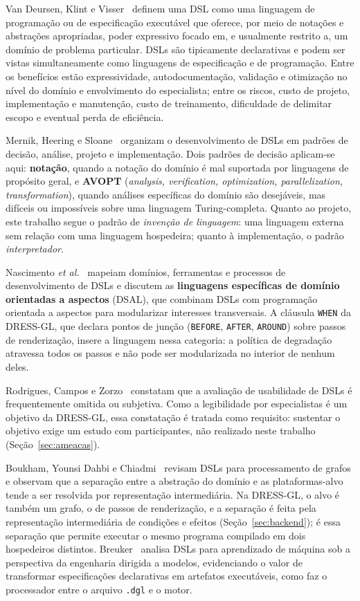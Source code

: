 \documentclass[conference]{IEEEtran}
\begin{document}
Van Deursen, Klint e Visser~\cite{vandeursen2000} definem uma DSL como uma
linguagem de programação ou de especificação executável que oferece, por meio
de notações e abstrações apropriadas, poder expressivo focado em, e usualmente
restrito a, um domínio de problema particular. DSLs são tipicamente
declarativas e podem ser vistas simultaneamente como linguagens de
especificação e de programação. Entre os benefícios estão expressividade,
autodocumentação, validação e otimização no nível do domínio e envolvimento do
especialista; entre os riscos, custo de projeto, implementação e manutenção,
custo de treinamento, dificuldade de delimitar escopo e eventual perda de
eficiência.

Mernik, Heering e Sloane~\cite{mernik2005} organizam o desenvolvimento de DSLs
em padrões de decisão, análise, projeto e implementação. Dois padrões de
decisão aplicam-se aqui: \textbf{notação}, quando a notação do domínio é mal
suportada por linguagens de propósito geral, e \textbf{AVOPT}
(\textit{analysis, verification, optimization, parallelization,
transformation}), quando análises específicas do domínio são desejáveis, mas
difíceis ou impossíveis sobre uma linguagem Turing-completa. Quanto ao projeto,
este trabalho segue o padrão de \textit{invenção de linguagem}: uma linguagem
externa sem relação com uma linguagem hospedeira; quanto à implementação, o
padrão \textit{interpretador}.

Nascimento \textit{et al.}~\cite{nascimento2012} mapeiam domínios, ferramentas e
processos de desenvolvimento de DSLs e discutem as \textbf{linguagens
específicas de domínio orientadas a aspectos} (DSAL), que combinam DSLs com
programação orientada a aspectos para modularizar interesses transversais. A
cláusula \texttt{WHEN} da DRESS-GL, que declara pontos de junção
(\texttt{BEFORE}, \texttt{AFTER}, \texttt{AROUND}) sobre passos de renderização,
insere a linguagem nessa categoria: a política de degradação atravessa todos os
passos e não pode ser modularizada no interior de nenhum deles.

Rodrigues, Campos e Zorzo~\cite{rodrigues2017} constatam que a avaliação de
usabilidade de DSLs é frequentemente omitida ou subjetiva. Como a legibilidade
por especialistas é um objetivo da DRESS-GL, essa constatação é tratada como
requisito: sustentar o objetivo exige um estudo com participantes, não
realizado neste trabalho (Seção~\ref{sec:ameacas}).

Boukham, Younsi Dahbi e Chiadmi~\cite{boukham2025} revisam DSLs para
processamento de grafos e observam que a separação entre a abstração do domínio
e as plataformas-alvo tende a ser resolvida por representação intermediária. Na
DRESS-GL, o alvo é também um grafo, o de passos de renderização, e a separação
é feita pela representação intermediária de condições e efeitos
(Seção~\ref{sec:backend}); é essa separação que permite executar o mesmo
programa compilado em dois hospedeiros distintos. Breuker~\cite{breuker2014}
analisa DSLs para aprendizado de máquina sob a perspectiva da engenharia
dirigida a modelos, evidenciando o valor de transformar especificações
declarativas em artefatos executáveis, como faz o processador entre o arquivo
\texttt{.dgl} e o motor.
\end{document}
